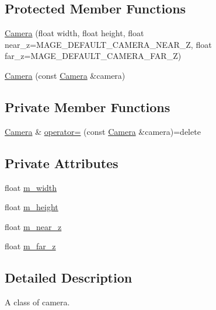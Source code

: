 \subsection*{Protected Member Functions}
\begin{DoxyCompactItemize}
\item 
\hyperlink{classmage_1_1_camera_a64980217b5ae3817affab70eb3e61342}{Camera} (float width, float height, float near\+\_\+z=M\+A\+G\+E\+\_\+\+D\+E\+F\+A\+U\+L\+T\+\_\+\+C\+A\+M\+E\+R\+A\+\_\+\+N\+E\+A\+R\+\_\+Z, float far\+\_\+z=M\+A\+G\+E\+\_\+\+D\+E\+F\+A\+U\+L\+T\+\_\+\+C\+A\+M\+E\+R\+A\+\_\+\+F\+A\+R\+\_\+Z)
\item 
\hyperlink{classmage_1_1_camera_a28d9280bd7067ec4d28392558cc2b767}{Camera} (const \hyperlink{classmage_1_1_camera}{Camera} \&camera)
\end{DoxyCompactItemize}
\subsection*{Private Member Functions}
\begin{DoxyCompactItemize}
\item 
\hyperlink{classmage_1_1_camera}{Camera} \& \hyperlink{classmage_1_1_camera_a6a5d3006100ba608f1b06b976f20a430}{operator=} (const \hyperlink{classmage_1_1_camera}{Camera} \&camera)=delete
\end{DoxyCompactItemize}
\subsection*{Private Attributes}
\begin{DoxyCompactItemize}
\item 
float \hyperlink{classmage_1_1_camera_acc8f371214af02fdac9a1ff04508c4ca}{m\+\_\+width}
\item 
float \hyperlink{classmage_1_1_camera_a48485eca596702f0e5985ec8b7db35a5}{m\+\_\+height}
\item 
float \hyperlink{classmage_1_1_camera_a685f8700a29d1f1eff2bec353c3ec970}{m\+\_\+near\+\_\+z}
\item 
float \hyperlink{classmage_1_1_camera_abe2eeca725ce3da238256007454b241f}{m\+\_\+far\+\_\+z}
\end{DoxyCompactItemize}


\subsection{Detailed Description}
A class of camera. 

